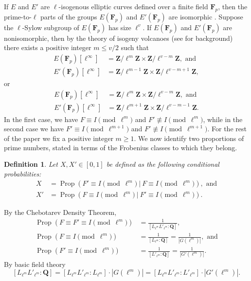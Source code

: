 \documentclass{amsart}
\newcommand{\Z}{\mathbf{Z}}
\newcommand{\F}{\mathbf{F}}
\newcommand{\Q}{\mathbf{Q}}
\newcommand{\Prop}{\operatorname{Prop}}
\numberwithin{equation}{section}
\theoremstyle{plain}
\newtheorem{defn}[equation]{Definition}
\theoremstyle{remark}
\begin{document}
If $E$ and $E'$ are $\ell$-isogenous elliptic curves defined over a finite field $\F_p$, then the prime-to-$\ell$ parts of the groups $E(\F_p)$ and $E'(\F_p)$ are isomorphic \cite[Cor.~1]{cullinan1}.   Suppose the $\ell$-Sylow subgroup of $E(\F_p)$ has size $\ell^v$.  If $E(\F_p)$ and $E'(\F_p)$ are nonisomorphic, then by the theory of isogeny volcanoes (see \cite{sutherland} for background)  there exists a positive integer $m \leq v/2$ such that
\begin{align*}
E(\F_p)[\ell^\infty] &= \Z/\ell^{m}\Z \times \Z/\ell^{v-m} \Z, \text{ and} \\
E'(\F_p)[\ell^\infty] &= \Z/\ell^{m-1}\Z \times \Z/\ell^{v-m+1} \Z,
\end{align*}
or
\begin{align*}
E(\F_p)[\ell^\infty] &= \Z/\ell^{m}\Z \times \Z/\ell^{v-m} \Z, \text{ and} \\
E'(\F_p)[\ell^\infty] &= \Z/\ell^{m+1}\Z \times \Z/\ell^{v-m-1} \Z.
\end{align*}
In the first case, we have $F \equiv I \pmod{\ell^m}$ and $F' \not \equiv I \pmod{\ell^m}$, while in the second case we have $F'\equiv I \pmod{\ell^{m+1}}$ and $F' \not \equiv I \pmod{\ell^{m+1}}$.   
For the rest of the paper we fix a positive integer $m \geq 1$.   We now identify two proportions of prime numbers, stated in terms of the Frobenius classes to which they belong.

\begin{defn}
Let $X,X' \in [0,1]$ be defined as the following conditional probabilities:
\begin{align*}
X &= \Prop \left( F' \equiv I \pmod{\ell^m} ~|~ F \equiv I \pmod{\ell^m} \right),\text{ and} \\
X' &= \Prop \left( F \equiv I \pmod{\ell^m} ~|~ F' \equiv I \pmod{\ell^m} \right).
\end{align*}
\end{defn}

By the Chebotarev Density Theorem,
\begin{align*}
\Prop \left(F \equiv F' \equiv I \pmod{\ell^m} \right) &=  \frac{1}{[L_{\ell^m}L'_{\ell^m} :\Q]},  \\
\Prop \left(F \equiv I \pmod{\ell^m} \right) &= \frac{1}{[L_{\ell^m}:\Q]} = \frac{1}{|G(\ell^m)|}, \text{ and} \\
\Prop \left(F' \equiv I \pmod{\ell^m} \right) &= \frac{1}{[L'_{\ell^m}:\Q]} = \frac{1}{|G'(\ell^m)|}.
\end{align*}
By basic field theory 
\[
[L_{\ell^m}L'_{\ell^m} :\Q] = [L_{\ell^m}L'_{\ell^m}:L_{\ell^m}]\cdot |G(\ell^m)| = [L_{\ell^m}L'_{\ell^m}:L'_{\ell^m}]\cdot |G'(\ell^m)|.
\]
\end{document}
